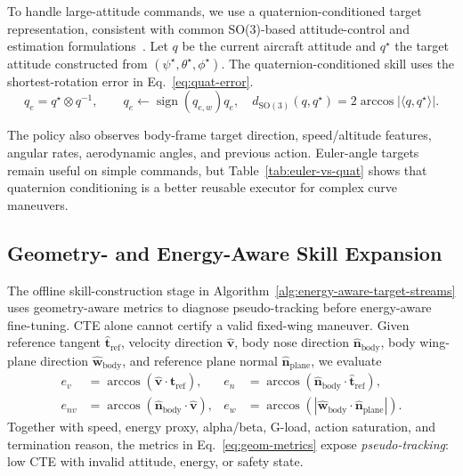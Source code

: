 \documentclass{article}
\begin{document}
To handle large-attitude commands, we use a quaternion-conditioned target representation, consistent with common SO(3)-based attitude-control and estimation formulations~\citep{lee2010geometric,mahony2008nonlinear}.
Let $q$ be the current aircraft attitude and $q^\star$ the target attitude constructed from $(\psi^\star,\theta^\star,\phi^\star)$.
The quaternion-conditioned skill uses the shortest-rotation error in Eq.~\eqref{eq:quat-error}.
\begin{equation}
  q_e = q^\star \otimes q^{-1}, \qquad
  q_e \leftarrow \operatorname{sign}(q_{e,w})q_e,
  \quad
  d_{\mathrm{SO(3)}}(q,q^\star)=2\arccos|\langle q,q^\star\rangle|.
  \label{eq:quat-error}
\end{equation}

The policy also observes body-frame target direction, speed/altitude features, angular rates, aerodynamic angles, and previous action.
Euler-angle targets remain useful on simple commands, but Table~\ref{tab:euler-vs-quat} shows that quaternion conditioning is a better reusable executor for complex curve maneuvers.

\subsection{Geometry- and Energy-Aware Skill Expansion}
The offline skill-construction stage in Algorithm~\ref{alg:energy-aware-target-streams} uses geometry-aware metrics to diagnose pseudo-tracking before energy-aware fine-tuning.
CTE alone cannot certify a valid fixed-wing maneuver.
Given reference tangent $\hat{\bm{t}}_{\mathrm{ref}}$, velocity direction $\hat{\bm{v}}$, body nose direction $\hat{\bm{n}}_{\mathrm{body}}$, body wing-plane direction $\hat{\bm{w}}_{\mathrm{body}}$, and reference plane normal $\hat{\bm{n}}_{\mathrm{plane}}$, we evaluate
\begin{align}
  e_v &= \arccos(\hat{\bm{v}}\!\cdot\!\hat{\bm{t}}_{\mathrm{ref}}), &
  e_n &= \arccos(\hat{\bm{n}}_{\mathrm{body}}\!\cdot\!\hat{\bm{t}}_{\mathrm{ref}}), \label{eq:geom-metrics}\\
  e_{nv} &= \arccos(\hat{\bm{n}}_{\mathrm{body}}\!\cdot\!\hat{\bm{v}}), &
  e_w &= \arccos\!\left(|\hat{\bm{w}}_{\mathrm{body}}\!\cdot\!\hat{\bm{n}}_{\mathrm{plane}}|\right).
  \nonumber
\end{align}
Together with speed, energy proxy, alpha/beta, G-load, action saturation, and termination reason, the metrics in Eq.~\eqref{eq:geom-metrics} expose \emph{pseudo-tracking}: low CTE with invalid attitude, energy, or safety state.
\end{document}
